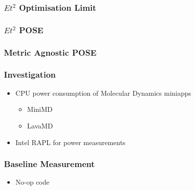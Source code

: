 \documentclass{beamer}
\begin{document}
  \begin{frame}
    \frametitle{$Et^2$ Optimisation Limit}
    \newcommand*{\OPTBOUND}{}%
    \newcommand*{\CONTBOUND}{}%
    \newcommand*{\OPTLIMIT}{}%
    \begin{figure}
    \centering
    
    \end{figure}
  \end{frame}

  \begin{frame}
    \frametitle{$Et^2$ POSE}
    \newcommand*{\OPTBOUND}{}%
    \newcommand*{\CONTBOUND}{}%
    \newcommand*{\OPTLIMIT}{}%
    \newcommand*{\POSELABELS}{}%
    \begin{figure}
    \centering
    
    \end{figure}
  \end{frame}




  \begin{frame}
    \frametitle{Metric Agnostic POSE}
    \begin{figure}
    \centering
    
    \end{figure}
  \end{frame}






  \begin{frame}
    \frametitle{Investigation}
    \begin{itemize}
      \item CPU power consumption of Molecular Dynamics miniapps
      \begin{itemize}
        \item MiniMD
        \item LavaMD
      \end{itemize}
      \item Intel RAPL for power measurements
    \end{itemize}
  \end{frame}


  \begin{frame}
    \frametitle{Baseline Measurement}
    \begin{itemize}
      \item No-op code
    \end{itemize}
  \end{frame}
\end{document}
